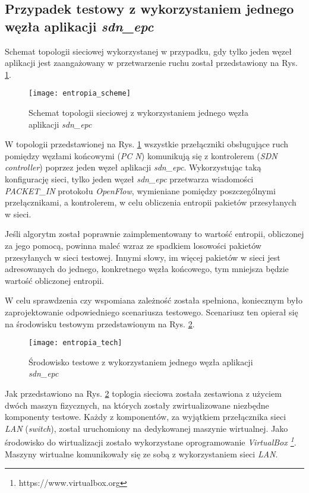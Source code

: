 \subsection{Przypadek testowy z wykorzystaniem jednego węzła aplikacji
  \textit{sdn\_epc}} \label{entropy_one_node}

Schemat topologii sieciowej wykorzystanej w przypadku, gdy tylko jeden węzeł
aplikacji jest zaangażowany w przetwarzenie ruchu został przedstawiony na
Rys. \ref{fig:entropia_scheme}.

\begin{figure}[h]
\centering
\texttt{[image: entropia\_scheme]}
\caption{Schemat topologii sieciowej z wykorzystaniem jednego węzła aplikacji
  \textit{sdn\_epc}}
\label{fig:entropia_scheme}
\end{figure}

W topologii przedstawionej na Rys. \ref{fig:entropia_scheme} wszystkie
przełączniki obsługujące ruch pomiędzy węzłami końcowymi (\textit{PC N})
komunikują się z kontrolerem (\textit{SDN controller}) poprzez jeden węzeł
aplikacji \textit{sdn\_epc}. Wykorzystując taką konfigurację sieci, tylko jeden
węzeł \textit{sdn\_epc} przetwarza wiadomości \mbox{\textit{PACKET\_IN}}
protokołu \textit{OpenFlow}, wymieniane pomiędzy poszczególnymi przełącznikami,
a kontrolerem, w celu obliczenia entropii pakietów przesyłanych w sieci.

Jeśli algorytm został poprawnie zaimplementowany to wartość entropii,
obliczonej za jego pomocą, powinna maleć wzraz ze spadkiem losowości pakietów
przesyłanych w sieci testowej. Innymi słowy, im więcej pakietów w sieci jest
adresowanych do jednego, konkretnego węzła końcowego, tym mniejsza będzie wartość
obliczonej entropii.

W celu sprawdzenia czy wspomiana zależność została spełniona, koniecznym było
zaprojektowanie odpowiedniego scenariusza testowego. Scenariusz ten opierał się
na środowisku testowym przedstawionym na Rys. \ref{fig:entropia_tech}.

\begin{figure}[h]
\centering
\texttt{[image: entropia\_tech]}
\caption{Środowisko testowe z wykorzystaniem jednego węzła aplikacji
  \textit{sdn\_epc}}
\label{fig:entropia_tech}
\end{figure}

Jak przedstawiono na Rys. \ref{fig:entropia_tech} toplogia sieciowa została
zestawiona z użyciem dwóch maszyn fizycznych, na których zostały zwirtualizowane
niezbędne komponenty testowe. Każdy z komponentów, za wyjątkiem przełącznika
sieci \textit{LAN} (\textit{switch}), został uruchomiony na dedykowanej maszynie
wirtualnej. Jako środowisko do wirtualizacji zostało wykorzystane oprogramowanie
\textit{VirtualBox \footnote{https://www.virtualbox.org}}. Maszyny wirtualne
komunikowały się ze sobą z wykorzystaniem sieci \textit{LAN}.

